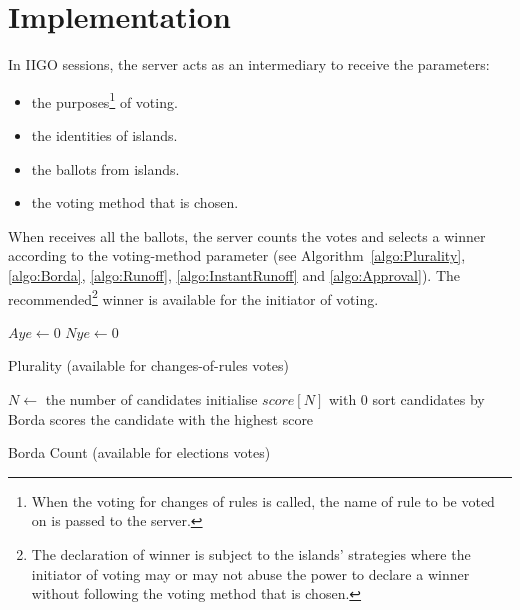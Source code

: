 \section{Implementation}
\label{sec:VotingImplementation}
In IIGO sessions, the server acts as an intermediary to receive the parameters:
\begin{itemize}
    \item the purposes\footnote{When the voting for changes of rules is called, the name of rule to be voted on is passed to the server.} of voting.
    \item the identities of islands.
    \item the ballots from islands.
    \item the voting method that is chosen.
\end{itemize}

When receives all the ballots, the server counts the votes and selects a winner according to the voting-method parameter (see Algorithm~\ref{algo:Plurality}, \ref{algo:Borda}, \ref{algo:Runoff}, \ref{algo:InstantRunoff} and \ref{algo:Approval}). The recommended\footnote{The declaration of winner is subject to the islands' strategies where the initiator of voting may or may not abuse the power to declare a winner without following the voting method that is chosen.} winner is available for the initiator of voting.

\begin{algorithm}[!h]
$Aye \gets 0$\;
$Nye \gets 0$\;
\caption{Plurality (available for changes-of-rules votes)}\label{algo:Plurality}
\end{algorithm}


\begin{algorithm}[!h]
$N \gets$ the number of candidates\;
initialise $score[N]$ with $0$\;
sort candidates by Borda scores\;
\Return the candidate with the highest score
\caption{Borda Count (available for elections votes)}\label{algo:Borda}
\end{algorithm}


